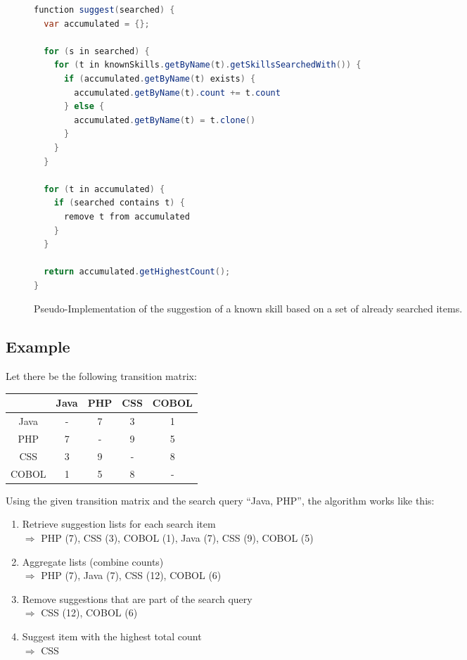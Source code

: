 \newpage

\begin{figure}
\begin{lstlisting}[language=Java]
function suggest(searched) {
  var accumulated = {};

  for (s in searched) {
    for (t in knownSkills.getByName(t).getSkillsSearchedWith()) {
      if (accumulated.getByName(t) exists) {
        accumulated.getByName(t).count += t.count
      } else {
        accumulated.getByName(t) = t.clone()
      }
    }
  }

  for (t in accumulated) {
    if (searched contains t) {
      remove t from accumulated
    }
  }

  return accumulated.getHighestCount();
}

\end{lstlisting}
\caption[Pseudocode: Skill Suggestion Algorithm]{Pseudo-Implementation of the suggestion of a known skill based on a set of already searched items.}
\end{figure}

\subsection{Example}
Let there be the following transition matrix:

\begin{center}
\begin{tabular}{c | c |c | c | c}
		  & Java & PHP & CSS & COBOL\\
	\hline
	Java  &  -   &  7  &  3  &   1  \\
	\hline
	PHP   &  7   &  -  &  9  &   5  \\
	\hline
	CSS   &  3   &  9  &  -  &   8  \\
	\hline
	COBOL &  1   &  5  &  8  &   -  \\
\end{tabular}
\end{center}

Using the given transition matrix and the search query ``Java, PHP'', the algorithm works like this:
\begin{enumerate}
	\item Retrieve suggestion lists for each search item\\
		$\Rightarrow$ PHP (7), CSS (3), COBOL (1), Java (7), CSS (9), COBOL (5)
	\item Aggregate lists (combine counts)\\
		$\Rightarrow$ PHP (7), Java (7), CSS (12), COBOL (6)
	\item Remove suggestions that are part of the search query\\
		$\Rightarrow$ CSS (12), COBOL (6)
	\item Suggest item with the highest total count\\
		$\Rightarrow$ CSS
\end{enumerate}

